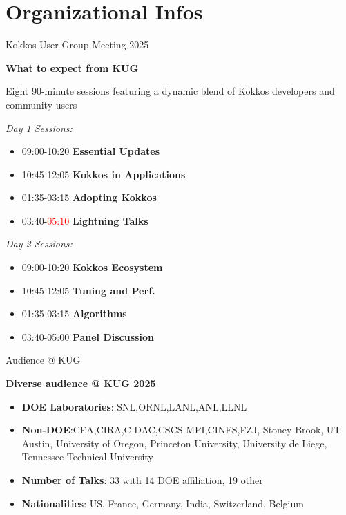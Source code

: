 \section{Organizational Infos}

\begin{frame}[fragile]{Kokkos User Group Meeting 2025}
\begin{center}
\textbf{What to expect from KUG}
\end{center}

\begin{center}
  Eight 90-minute sessions featuring a dynamic blend of Kokkos developers and community users
\end{center}

  \begin{multicols}{2}
    \textit{Day 1 Sessions:}
      \begin{itemize}
        \item{09:00-10:20 \textbf{Essential Updates}}
        \item{10:45-12:05 \textbf{Kokkos in Applications}}
        \item{01:35-03:15 \textbf{Adopting Kokkos}}
        \item{03:40-\textcolor{red}{05:10} \textbf{Lightning Talks}}
    \end{itemize}

    \columnbreak

    \textit{Day 2 Sessions:}
      \begin{itemize}
        \item{09:00-10:20 \textbf{Kokkos Ecosystem}}
        \item{10:45-12:05 \textbf{Tuning and Perf.}}
        \item{01:35-03:15 \textbf{Algorithms}}
        \item{03:40-05:00 \textbf{Panel Discussion}}
    \end{itemize}
  \end{multicols}
\end{frame}

\begin{frame}[fragile]{Audience @ KUG}
\begin{center}
\textbf{Diverse audience @ KUG 2025}
\vspace{0.5cm}

  \begin{itemize}
    \item{\textbf{DOE Laboratories}: SNL,ORNL,LANL,ANL,LLNL}
    \item{\textbf{Non-DOE}:CEA,CIRA,C-DAC,CSCS MPI,CINES,FZJ, Stoney Brook, UT Austin, University of Oregon, Princeton University, University de Liege, Tennessee Technical University}
    \item{\textbf{Number of Talks}: 33 with 14 DOE affiliation, 19 other}
    \item{\textbf{Nationalities}: US, France, Germany, India, Switzerland, Belgium}
  \end{itemize}

\end{center}
\end{frame}

